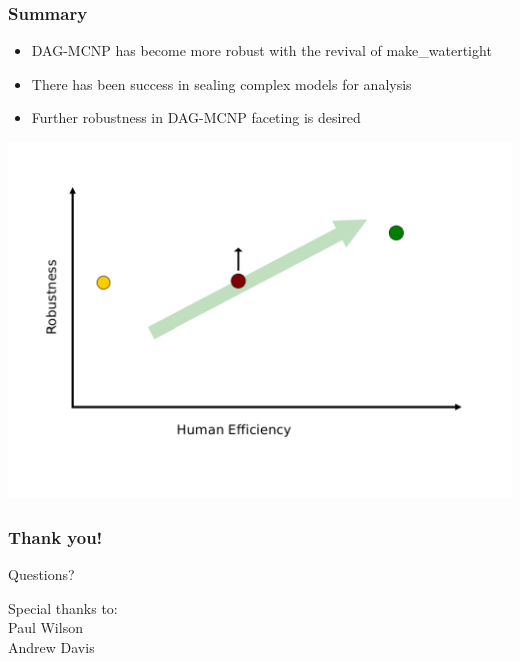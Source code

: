 \documentclass[14pt]{beamer}
\begin{document}
\begin{frame}
\frametitle{Summary}
\begin{itemize}
\item DAG-MCNP has become more robust with the revival of make\_watertight

\item There has been success in sealing complex models for analysis

\item Further robustness in DAG-MCNP faceting is desired
\end{itemize}
\begin{center}
\includegraphics[scale=0.2]{InitialGraphImpact_postmw.png}
\end{center}

\end{frame}


\begin{frame}
\frametitle{Thank you!}

\begin{center}
Questions?
\end{center}
\vfill
Special thanks to:\\
Paul Wilson \\
Andrew Davis
\end{frame}
\end{document}
